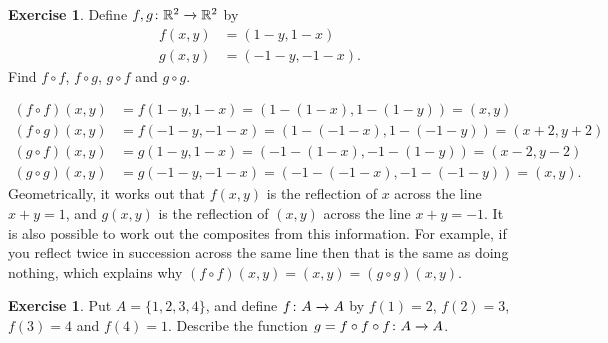 \documentclass[a4paper]{book}
\theoremstyle{definition}
\newtheorem{exercise}[theorem]{Exercise}
\renewenvironment{solution}{\SolutionInline}{\endSolutionInline}
\begin{document}
\begin{exercise}
 Define $f,g\colon{\mathbb{R}}^2\xrightarrow{}{\mathbb{R}}^2$ by 
 \begin{align*}
  f(x,y) &= (1-y,1-x) \\
  g(x,y) &= (-1-y,-1-x).
 \end{align*}
 Find $f\circ f$, $f\circ g$, $g\circ f$ and $g\circ g$.
\end{exercise}
\begin{solution}
 \begin{align*}
  (f\circ f)(x,y) &= f(1-y,1-x) = (1-(1-x),1-(1-y)) = (x,y) \\
  (f\circ g)(x,y) &= f(-1-y,-1-x) = (1-(-1-x),1-(-1-y)) = (x+2,y+2) \\
  (g\circ f)(x,y) &= g(1-y,1-x) = (-1-(1-x),-1-(1-y)) = (x-2,y-2) \\
  (g\circ g)(x,y) &= g(-1-y,-1-x) = (-1-(-1-x),-1-(-1-y)) = (x,y).
 \end{align*}
 Geometrically, it works out that $f(x,y)$ is the reflection of $x$
 across the line $x+y=1$, and $g(x,y)$ is the reflection of $(x,y)$
 across the line $x+y=-1$.  It is also possible to work out the
 composites from this information.  For example, if you reflect twice
 in succession across the same line then that is the same as doing
 nothing, which explains why $(f\circ f)(x,y)=(x,y)=(g\circ g)(x,y)$.
\end{solution}
\begin{exercise}
 Put $A=\{1,2,3,4\}$, and define $f\colon A\xrightarrow{}A$ by 
 $f(1)=2$, $f(2)=3$, $f(3)=4$ and $f(4)=1$.  Describe the function 
 $g=f\circ f\circ f\colon A\xrightarrow{}A$.
\end{exercise}
\end{document}
